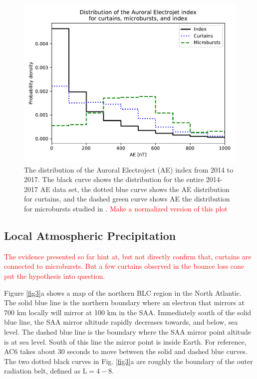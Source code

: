 \documentclass[draft]{agujournal2019}
\begin{document}
\begin{figure}
\includegraphics[width=\textwidth]{ac6_curtain_microburst_AE_dist.pdf}
\caption{The distribution of the Auroral Electroject (AE) index from 2014 to 2017. The black curve shows the distribution for the entire 2014-2017 AE data set, the dotted blue curve shows the AE distribution for curtains, and the dashed green curve shows AE the distribution for microbursts studied in . \textcolor{red}{Make a normalized version of this plot}}
\label{ae_dist}
\end{figure}

\subsection{Local Atmospheric Precipitation}
\textcolor{red}{The evidence presented so far hint at, but not directly confirm that, curtains are connected to microbursts. But a few curtains observed in the bounce loss cone put the hypothesis into question.}

Figure \ref{fig3}a shows a map of the northern BLC region in the North Atlantic. The solid blue line is the northern boundary where an electron that mirrors at 700 km locally will mirror at 100 km in the SAA. Immediately south of the solid blue line, the SAA mirror altitude rapidly decreases towards, and below, sea level. The dashed blue line is the boundary where the SAA mirror point altitude is at sea level. South of this line the mirror point is inside Earth. For reference, AC6 takes about 30 seconds to move between the solid and dashed blue curves. The two dotted black curves in Fig. \ref{fig3}a are roughly the boundary of the outer radiation belt, defined as $\mathrm{L}=4-8$.
\end{document}
